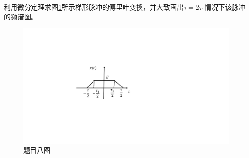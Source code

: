 \documentclass[answers]{exam}  %
\begin{document}
\begin{questions}
\question 利用微分定理求图\ref{fig:8}所示梯形脉冲的傅里叶变换，并大致画出$\tau=2\tau_1$情况下该脉冲的频谱图。
\begin{figure}
	\centering
	\includegraphics[width=\linewidth]{pics/dsp2-10.pdf}
	\caption{题目八图}
	\label{fig:8}
\end{figure}


\end{questions}
\end{document}
